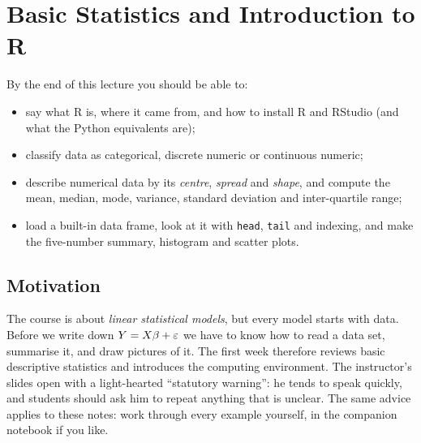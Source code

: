 \section{Basic Statistics and Introduction to R}\label{sec:L01}


\begin{guiding*}
By the end of this lecture you should be able to:
\begin{itemize}
  \item say what R is, where it came from, and how to install R and RStudio (and what the Python equivalents are);
  \item classify data as categorical, discrete numeric or continuous numeric;
  \item describe numerical data by its \emph{centre}, \emph{spread} and \emph{shape}, and compute the mean, median, mode, variance, standard deviation and inter-quartile range;
  \item load a built-in data frame, look at it with \texttt{head}, \texttt{tail} and indexing, and make the five-number summary, histogram and scatter plots.
\end{itemize}
\end{guiding*}

\subsection{Motivation}
The course is about \emph{linear statistical models}, but every model starts with data.
Before we write down $Y = X\beta+\varepsilon$ we have to know how to read a data set, summarise it,
and draw pictures of it. The first week therefore reviews basic descriptive statistics and
introduces the computing environment. The instructor's slides open with a light-hearted
``statutory warning'': he tends to speak quickly, and students should ask him to repeat anything
that is unclear. The same advice applies to these notes: work through every example yourself,
in the companion notebook if you like.

